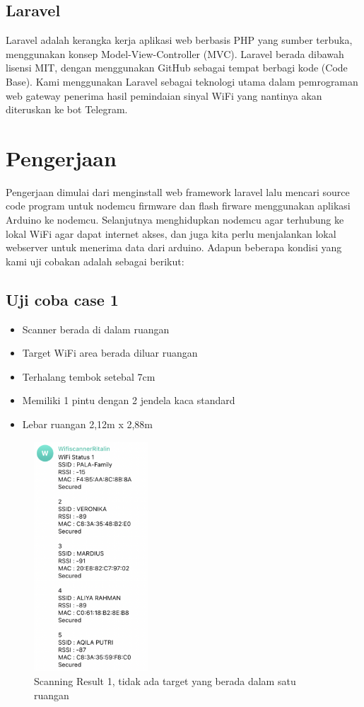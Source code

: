 \documentclass[conference]{IEEEtran}
\begin{document}
\subsection{Laravel}
Laravel adalah kerangka kerja aplikasi web berbasis PHP yang sumber terbuka, menggunakan konsep Model-View-Controller (MVC). Laravel berada dibawah lisensi MIT, dengan menggunakan GitHub sebagai tempat berbagi kode (Code Base). Kami menggunakan Laravel sebagai teknologi utama dalam pemrograman web gateway penerima hasil pemindaian sinyal WiFi yang nantinya akan diteruskan ke bot Telegram.

\section{Pengerjaan}\label{pengerjaan}
Pengerjaan dimulai dari menginstall web framework laravel lalu mencari source code program untuk nodemcu firmware dan flash firware menggunakan aplikasi Arduino ke nodemcu. Selanjutnya menghidupkan nodemcu agar terhubung ke lokal WiFi agar dapat internet akses, dan juga kita perlu menjalankan lokal webserver untuk menerima data dari arduino. Adapun beberapa kondisi yang kami uji cobakan adalah sebagai berikut:

\subsection{Uji coba case 1}

\begin{itemize}
  \item Scanner berada di dalam ruangan
  \item Target WiFi area berada diluar ruangan
  \item Terhalang tembok setebal 7cm 
  \item Memiliki 1 pintu dengan 2 jendela kaca standard
  \item Lebar ruangan 2,12m x 2,88m
\end{itemize}

\begin{figure}[h]
  \centering
  \includegraphics[width=0.38\textwidth]{scanning-result.png}
  \caption{Scanning Result 1, tidak ada target yang berada dalam satu ruangan}
\end{figure}
\end{document}
